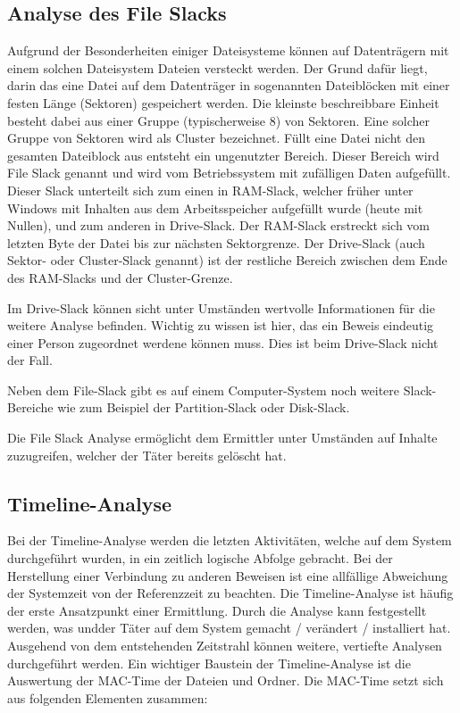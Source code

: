 \subsection{Analyse des File Slacks}
Aufgrund der Besonderheiten einiger Dateisysteme können auf Datenträgern mit einem solchen Dateisystem Dateien versteckt werden. Der Grund dafür liegt, darin das eine Datei auf dem Datenträger in sogenannten Dateiblöcken mit einer festen Länge (Sektoren) gespeichert werden. Die kleinste beschreibbare Einheit besteht dabei aus einer Gruppe (typischerweise 8) von Sektoren. Eine solcher Gruppe von Sektoren wird als Cluster bezeichnet. Füllt eine Datei nicht den gesamten Dateiblock aus entsteht ein ungenutzter Bereich. Dieser Bereich wird File Slack genannt und wird vom Betriebssystem mit zufälligen Daten aufgefüllt. Dieser Slack unterteilt sich zum einen in RAM-Slack, welcher früher unter Windows mit Inhalten aus dem Arbeitsspeicher aufgefüllt wurde (heute mit Nullen), und zum anderen in Drive-Slack. Der RAM-Slack erstreckt sich vom letzten Byte der Datei bis zur nächsten Sektorgrenze. Der Drive-Slack (auch Sektor- oder Cluster-Slack genannt) ist der restliche Bereich zwischen dem Ende des RAM-Slacks und der Cluster-Grenze.

Im Drive-Slack können sicht unter Umständen wertvolle Informationen für die weitere Analyse befinden. Wichtig zu wissen ist hier, das ein Beweis eindeutig einer Person zugeordnet werdene können muss. Dies ist beim Drive-Slack nicht der Fall.

Neben dem File-Slack gibt es auf einem Computer-System noch weitere Slack-Bereiche wie zum Beispiel der Partition-Slack oder Disk-Slack.

Die File Slack Analyse ermöglicht dem Ermittler unter Umständen auf Inhalte zuzugreifen, welcher der Täter bereits gelöscht hat.


\subsection{Timeline-Analyse}
Bei der Timeline-Analyse werden die letzten Aktivitäten, welche auf dem System durchgeführt wurden, in ein zeitlich logische Abfolge gebracht. Bei der Herstellung einer Verbindung zu anderen Beweisen ist eine allfällige Abweichung der Systemzeit von der Referenzzeit zu beachten. Die Timeline-Analyse ist häufig der erste Ansatzpunkt einer Ermittlung. Durch die Analyse kann festgestellt werden, was undder Täter auf dem System gemacht / verändert / installiert hat. Ausgehend von dem entstehenden Zeitstrahl können weitere, vertiefte Analysen durchgeführt werden. Ein wichtiger Baustein der Timeline-Analyse ist die Auswertung der MAC-Time der Dateien und Ordner. Die MAC-Time setzt sich aus folgenden Elementen zusammen:

